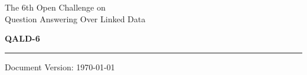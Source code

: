 \documentclass[a4paper]{article}
\begin{document}
\thispagestyle{empty}

%

\begin{center}

{\sc\large The 6th Open Challenge on\\ Question Answering Over Linked Data}

\vspace{.3cm}

{\huge\bf QALD-6}
\end{center}

\hrule

\vspace{.4cm}

{\sc Document Version:} \today

\vspace{.4cm}
\end{document}
